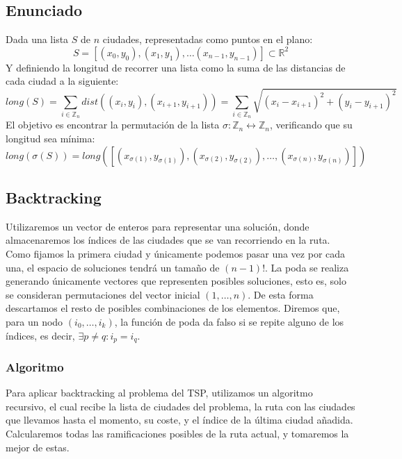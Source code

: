 \documentclass[a4paper, 11pt]{article} %
\begin{document}
      \subsection{Enunciado}
	Dada una lista $S$ de $n$ ciudades, representadas como puntos en el plano:
	\begin{equation}
	    S = [(x_0,y_0), (x_1,y_1), \dots (x_{n-1},y_{n-1})] \subset \mathbb{R}^2
	\end{equation}
	Y definiendo la longitud de recorrer una lista como la suma de las distancias de cada ciudad a la siguiente:
	\begin{equation}
	    long(S) = \sum_{i \in \mathbb{Z}_n} dist((x_i,y_i), (x_{i+1}, y_{i+1})) = \sum_{i \in \mathbb{Z}_n} \sqrt{(x_i-x_{i+1})^2 + (y_i-y_{i+1})^2}
	\end{equation}
	El objetivo es encontrar la permutación de la lista $\sigma : \mathbb{Z}_n \leftrightarrow \mathbb{Z}_n$, verificando que su longitud sea mínima:
	\begin{equation}
	    long(\sigma(S)) = long([(x_{\sigma(1)},y_{\sigma(1)}), (x_{\sigma(2)},y_{\sigma(2)}), \dots, (x_{\sigma(n)},y_{\sigma(n)})])
    \end{equation}
    
      \subsection{Backtracking}
	Utilizaremos un vector de enteros para representar una solución, donde almacenaremos los 
	índices de las ciudades que se van recorriendo en la ruta. Como fijamos la primera ciudad 
	y únicamente podemos pasar una vez por cada una, el espacio de soluciones tendrá un tamaño 
	de $(n-1)!$.
	La poda se realiza generando únicamente vectores que representen posibles soluciones, esto es, 
	solo se consideran permutaciones del vector inicial $(1,\dots,n)$. De esta forma descartamos el 
	resto de posibles combinaciones de los elementos. Diremos que, para un nodo $(i_0, \dots, i_k)$, 
	la función de poda da falso si se repite alguno de los índices, es decir, $\exists p\ne q : i_p = i_q$.
    
    \newpage
    
    \subsubsection{Algoritmo}
    
    Para aplicar backtracking al problema del TSP, utilizamos un algoritmo recursivo, el cual recibe la lista de 
    ciudades del problema, la ruta con las ciudades que llevamos hasta el momento, su coste, y el índice de la 
    última ciudad añadida. Calcularemos todas las ramificaciones posibles de la ruta actual, y tomaremos la mejor 
    de estas. 
    
\end{document}
